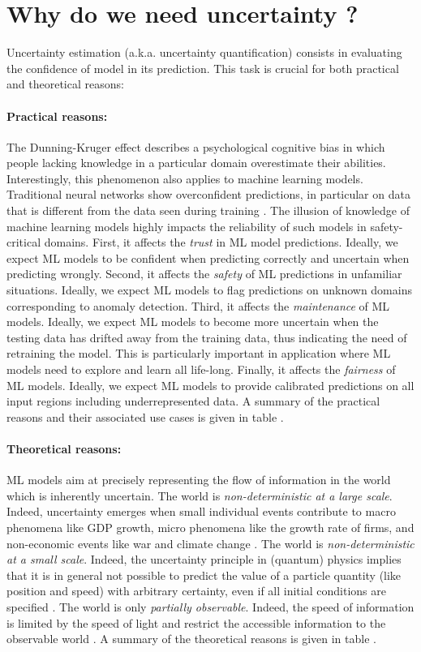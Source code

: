 \section{Why do we need uncertainty ?}

Uncertainty estimation (a.k.a. uncertainty quantification) consists in evaluating the confidence of model in its prediction. This task is crucial for both practical and theoretical reasons:

\paragraph*{Practical reasons:} The Dunning-Kruger effect  describes a psychological cognitive bias in which people lacking knowledge in a particular domain overestimate their abilities. Interestingly, this phenomenon also applies to machine learning models. Traditional neural networks show overconfident predictions, in particular on data that is different from the data seen during training . The illusion of knowledge of machine learning models highly impacts the reliability of such  models  in  safety-critical  domains. 
First, it affects the \emph{trust} in ML model predictions. Ideally, we expect ML models to be confident when predicting correctly and uncertain when predicting wrongly. 
Second, it affects the \emph{safety} of ML predictions in unfamiliar situations. Ideally, we expect ML models to flag predictions on unknown domains corresponding to anomaly detection.
Third, it affects the \emph{maintenance} of ML models. Ideally, we expect ML models to become more uncertain when the testing data has drifted away from the training data, thus indicating the need of retraining the model. This is particularly important in application where ML models need to explore and learn all life-long.
Finally, it affects the \emph{fairness} of ML models. Ideally, we expect ML models to provide calibrated predictions on all input regions including underrepresented data.
A summary of the practical reasons and their associated use cases is given in table .

\paragraph*{Theoretical reasons:} ML models aim at precisely representing the flow of information in the world which is inherently uncertain.
The world is \emph{non-deterministic at a large scale}. Indeed, uncertainty emerges when small individual events contribute to macro phenomena like GDP growth, micro phenomena like the growth rate of firms, and non-economic events like war and climate change \cite{macro-micro-uncertainty}.
The world is \emph{non-deterministic at a small scale}. Indeed, the uncertainty principle in (quantum) physics implies that it is in general not possible to predict the value of a particle quantity (like position and speed) with arbitrary certainty, even if all initial conditions are specified .
The world is only \emph{partially observable}. Indeed, the speed of information is limited by the speed of light and restrict the accessible information to the observable world .
A summary of the theoretical reasons is given in table .

